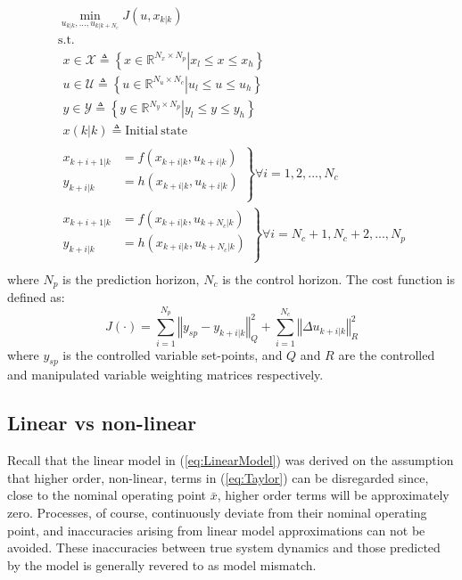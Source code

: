 \documentclass[preprint,authoryear,12pt]{elsarticle}
\begin{document}
\begin{equation}\label{eq:mpc_obj}
\begin{array}{l}
\underset{u_{k|k},...,u_{k|k+N_c}}{\min} J\left(u,x_{k|k}\right)\\
\mathrm{s.t.}\\
\begin{array}{l}
x\in \mathcal{X} \triangleq \left\lbrace \left.x\in\mathbb{R}^{N_x\times N_p}\right|x_l\leq x\leq x_h \right\rbrace\\
u\in \mathcal{U} \triangleq \left\lbrace \left.u\in\mathbb{R}^{N_u\times N_c}\right|u_l\leq u\leq u_h \right\rbrace\\
y\in \mathcal{Y} \triangleq \left\lbrace \left.y\in\mathbb{R}^{N_y\times N_p}\right|y_l\leq y\leq y_h \right\rbrace\\

x(k|k) \triangleq \mathrm{Initial~state}
\end{array}\\
\left.
\begin{array}{ll}
x_{k+i+1|k} &= f\left(x_{k+i|k},u_{k+i|k}\right) \\
y_{k+i|k} &= h\left(x_{k+i|k},u_{k+i|k}\right)\\
\end{array}\right\rbrace \forall i=1,2,...,N_c\\
\left.
\begin{array}{ll}
x_{k+i+1|k} &= f\left(x_{k+i|k},u_{k+N_c|k}\right) \\
y_{k+i|k} &= h\left(x_{k+i|k},u_{k+N_c|k}\right)\\
\end{array}\right\rbrace \forall i=N_c+1,N_c+2,...,N_p\\
\end{array}
\end{equation}
where $N_p$ is the prediction horizon, $N_c$ is the control horizon. The cost function is defined as:
\begin{equation}
J(\cdot) = \displaystyle\sum_{i=1}^{N_p} \left\Vert y_{sp}-y_{k+i|k} \right\Vert _Q^2  + \displaystyle\sum_{i=1}^{N_c} \left\Vert\Delta u_{k+i|k} \right\Vert_R^2
\end{equation}
where $y_{sp}$ is the controlled variable set-points, and $Q$ and $R$ are the controlled and manipulated variable weighting matrices respectively. 

\subsection{Linear vs non-linear}\label{sec:ModelValidation}
Recall that the linear model in (\ref{eq:LinearModel}) was derived on the assumption that higher order, non-linear, terms in (\ref{eq:Taylor}) can be disregarded since, close to the nominal operating point $\bar{x}$, higher order terms will be approximately zero. Processes, of course, continuously deviate from their nominal operating point, and inaccuracies arising from linear model approximations can not be avoided. These inaccuracies between true system dynamics and those predicted by the model is generally revered to as model mismatch.
\end{document}
